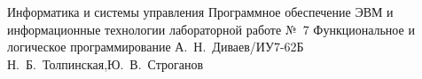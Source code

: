\documentclass[a4paper,oneside,14pt]{extarticle}
\begin{document}
\makereporttitle
    {Информатика и системы управления} %
    {Программное обеспечение ЭВМ и информационные технологии} %
    {лабораторной работе №~7} %
    {Функциональное и логическое программирование} %
    {} %
    {} %
    {А.~Н.~Диваев/ИУ7-62Б} %
    {Н.~Б.~Толпинская,Ю.~В.~Строганов} %

\setcounter{page}{2}




\end{document}
